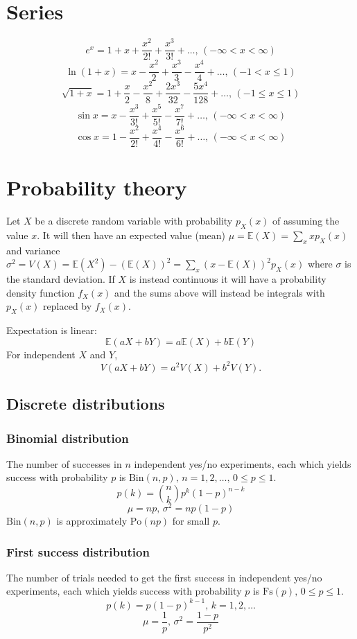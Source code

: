 \section{Series}
$$e^x = 1+x+\frac{x^2}{2!}+\frac{x^3}{3!}+\dots,\,(-\infty<x<\infty)$$
$$\ln(1+x) = x-\frac{x^2}{2}+\frac{x^3}{3}-\frac{x^4}{4}+\dots,\,(-1<x\leq1)$$
$$\sqrt{1+x} = 1+\frac{x}{2}-\frac{x^2}{8}+\frac{2x^3}{32}-\frac{5x^4}{128}+\dots,\,(-1\leq x\leq1)$$
$$\sin x = x-\frac{x^3}{3!}+\frac{x^5}{5!}-\frac{x^7}{7!}+\dots,\,(-\infty<x<\infty)$$
$$\cos x = 1-\frac{x^2}{2!}+\frac{x^4}{4!}-\frac{x^6}{6!}+\dots,\,(-\infty<x<\infty)$$

\section{Probability theory}
Let $X$ be a discrete random variable with probability $p_X(x)$ of assuming the
value $x$. It will then have an expected value (mean)
$\mu=\mathbb{E}(X)=\sum_xxp_X(x)$ and variance
$\sigma^2=V(X)=\mathbb{E}(X^2)-(\mathbb{E}(X))^2=\sum_x(x-\mathbb{E}(X))^2p_X(x)$
where $\sigma$ is the standard deviation. If $X$ is instead continuous it will
have a probability density function $f_X(x)$ and the sums above will instead be
integrals with $p_X(x)$ replaced by $f_X(x)$.

Expectation is linear:
\[\mathbb{E}(aX+bY) = a\mathbb{E}(X)+b\mathbb{E}(Y)\]
For independent $X$ and $Y$, \[V(aX+bY) = a^2V(X)+b^2V(Y).\]

\subsection{Discrete distributions}

\subsubsection{Binomial distribution}
The number of successes in $n$ independent yes/no experiments, each which
yields success with probability $p$ is $\textrm{Bin}(n,p),\,n=1,2,\dots,\,
     0\leq p\leq1$.
\[p(k)=\binom{n}{k}p^k(1-p)^{n-k}\]
\[\mu = np,\,\sigma^2=np(1-p)\]
$\textrm{Bin}(n,p)$ is approximately $\textrm{Po}(np)$ for small $p$.

\subsubsection{First success distribution}
The number of trials needed to get the first success in independent yes/no
experiments, each which yields success with probability $p$ is
$\textrm{Fs}(p),\,0\leq p\leq1$.
\[p(k)=p(1-p)^{k-1},\,k=1,2,\dots\]
\[\mu = \frac1p,\,\sigma^2=\frac{1-p}{p^2}\]

